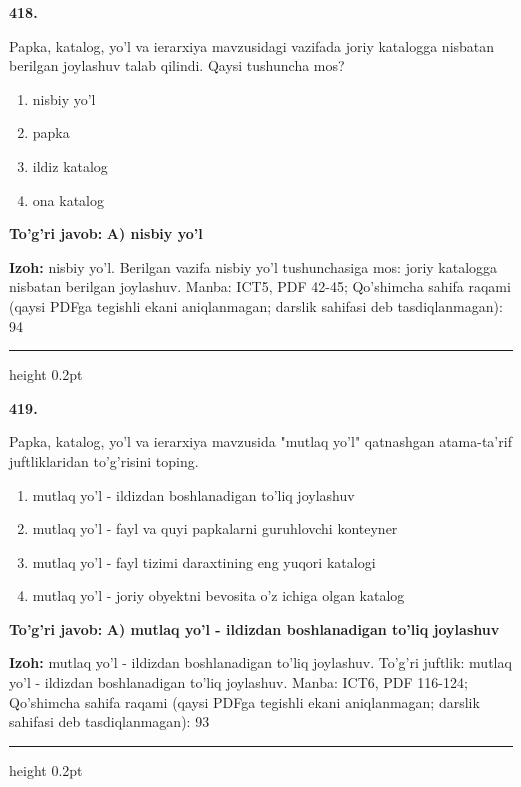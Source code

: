 \documentclass[10pt,a4paper]{article}
\begin{document}
{\bfseries\sffamily\color{ink} 418.}
\par
Papka, katalog, yo'l va ierarxiya mavzusidagi vazifada joriy katalogga nisbatan berilgan joylashuv talab qilindi. Qaysi tushuncha mos?
\begin{enumerate}[label=\Alph*),leftmargin=9mm]
\item nisbiy yo'l
\item papka
\item ildiz katalog
\item ona katalog
\end{enumerate}
\begin{tcolorbox}[enhanced,breakable,colback=teal!4,colframe=teal!60!black,boxrule=0.45pt,arc=1.2mm,left=2.7mm,right=2.7mm,top=1.8mm,bottom=1.8mm,before skip=2mm,after skip=2mm]
{\bfseries\sffamily\color{teal}To'g'ri javob:} \textbf{A) nisbiy yo'l}
\par\smallskip
{\bfseries Izoh:} nisbiy yo'l. Berilgan vazifa nisbiy yo'l tushunchasiga mos: joriy katalogga nisbatan berilgan joylashuv. Manba: ICT5, PDF 42-45; Qo'shimcha sahifa raqami (qaysi PDFga tegishli ekani aniqlanmagan; darslik sahifasi deb tasdiqlanmagan): 94
\end{tcolorbox}
\vspace{2mm}\hrule height 0.2pt\vspace{3mm}

{\bfseries\sffamily\color{ink} 419.}
\par
Papka, katalog, yo'l va ierarxiya mavzusida "mutlaq yo'l" qatnashgan atama-ta'rif juftliklaridan to'g'risini toping.
\begin{enumerate}[label=\Alph*),leftmargin=9mm]
\item mutlaq yo'l - ildizdan boshlanadigan to'liq joylashuv
\item mutlaq yo'l - fayl va quyi papkalarni guruhlovchi konteyner
\item mutlaq yo'l - fayl tizimi daraxtining eng yuqori katalogi
\item mutlaq yo'l - joriy obyektni bevosita o'z ichiga olgan katalog
\end{enumerate}
\begin{tcolorbox}[enhanced,breakable,colback=teal!4,colframe=teal!60!black,boxrule=0.45pt,arc=1.2mm,left=2.7mm,right=2.7mm,top=1.8mm,bottom=1.8mm,before skip=2mm,after skip=2mm]
{\bfseries\sffamily\color{teal}To'g'ri javob:} \textbf{A) mutlaq yo'l - ildizdan boshlanadigan to'liq joylashuv}
\par\smallskip
{\bfseries Izoh:} mutlaq yo'l - ildizdan boshlanadigan to'liq joylashuv. To'g'ri juftlik: mutlaq yo'l - ildizdan boshlanadigan to'liq joylashuv. Manba: ICT6, PDF 116-124; Qo'shimcha sahifa raqami (qaysi PDFga tegishli ekani aniqlanmagan; darslik sahifasi deb tasdiqlanmagan): 93
\end{tcolorbox}
\vspace{2mm}\hrule height 0.2pt\vspace{3mm}
\end{document}
